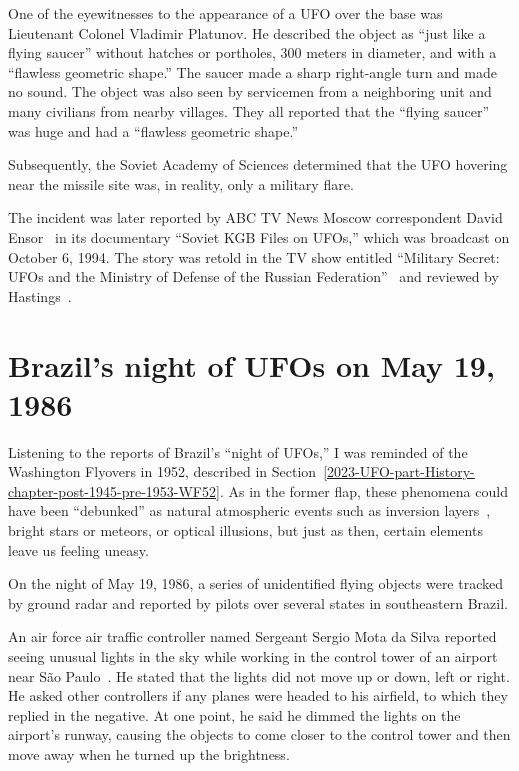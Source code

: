 One of the eyewitnesses to the appearance of a UFO over the base was Lieutenant Colonel Vladimir Platunov.
He described the object as ``just like a flying saucer'' without hatches or portholes,
300 meters in diameter, and with a ``flawless geometric shape.''
The saucer made a sharp right-angle turn and made no sound.
The object was also seen by servicemen from a neighboring unit and many civilians from nearby villages.
They all reported that the ``flying saucer'' was huge and had a ``flawless geometric shape.''

Subsequently, the Soviet Academy of Sciences determined that the UFO hovering near the missile site was,
in reality, only a military flare.

The incident was later reported by ABC TV News Moscow correspondent David Ensor~\cite{ABC-transcript-1994,Huneeus2011Jan}
in its documentary ``Soviet KGB Files on UFOs,'' which was broadcast on October 6, 1994.
The story was retold in the TV show entitled
``Military Secret: UFOs and the Ministry of Defense of the Russian Federation''~\cite{Hvar2012,TT-SU}
and reviewed by Hastings~\cite[Chapter 23]{Hastings2008Jan}.

\section{Brazil's night of UFOs on May 19, 1986}
\label{2023-UFO-chapter-History--1953-2016-bui1986}

Listening to the reports of Brazil's ``night of UFOs,''
I was reminded of the Washington Flyovers in 1952, described in Section~\ref{2023-UFO-part-History-chapter-post-1945-pre-1953-WF52}.
As in the former flap, these phenomena could have been ``debunked'' as natural atmospheric events
such as inversion layers~\cite{Menzel_1953},
bright stars or meteors, or optical illusions,
but just as then, certain elements leave us feeling uneasy.

On the night of May 19, 1986, a series of unidentified flying objects were tracked by ground radar and reported by pilots over several states in southeastern Brazil.

An air force air traffic controller named Sergeant Sergio Mota da Silva reported seeing unusual lights in the sky while working in the control tower of an airport near S\~ao Paulo~\cite{Tahir2022Jun}. He stated that the lights did not move up or down, left or right. He asked other controllers if any planes were headed to his airfield, to which they replied in the negative. At one point, he said he dimmed the lights on the airport's runway, causing the objects to come closer to the control tower and then move away when he turned up the brightness.

